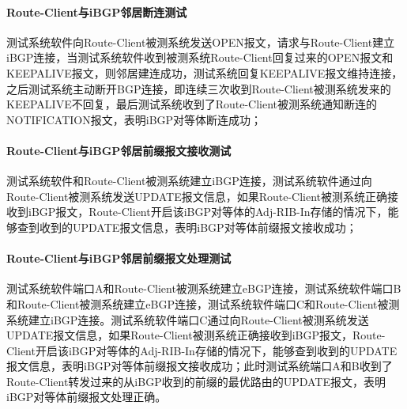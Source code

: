 \paragraph{Route-Client与iBGP邻居断连测试}
测试系统软件向Route-Client被测系统发送OPEN报文，请求与Route-Client建立iBGP连接，当测试系统软件收到被测系统Route-Client回复过来的OPEN报文和KEEPALIVE报文，则邻居建连成功，测试系统回复KEEPALIVE报文维持连接，之后测试系统主动断开BGP连接，即连续三次收到Route-Client被测系统发来的KEEPALIVE不回复，最后测试系统收到了Route-Client被测系统通知断连的NOTIFICATION报文，表明iBGP对等体断连成功；

\paragraph{Route-Client与iBGP邻居前缀报文接收测试}
测试系统软件和Route-Client被测系统建立iBGP连接，测试系统软件通过向Route-Client被测系统发送UPDATE报文信息，如果Route-Client被测系统正确接收到iBGP报文，Route-Client开启该iBGP对等体的Adj-RIB-In存储的情况下，能够查到收到的UPDATE报文信息，表明iBGP对等体前缀报文接收成功；

\paragraph{Route-Client与iBGP邻居前缀报文处理测试}
测试系统软件端口A和Route-Client被测系统建立eBGP连接，测试系统软件端口B和Route-Client被测系统建立eBGP连接，测试系统软件端口C和Route-Client被测系统建立iBGP连接。测试系统软件端口C通过向Route-Client被测系统发送UPDATE报文信息，如果Route-Client被测系统正确接收到iBGP报文，Route-Client开启该iBGP对等体的Adj-RIB-In存储的情况下，能够查到收到的UPDATE报文信息，表明iBGP对等体前缀报文接收成功；此时测试系统端口A和B收到了Route-Client转发过来的从iBGP收到的前缀的最优路由的UPDATE报文，表明iBGP对等体前缀报文处理正确。






